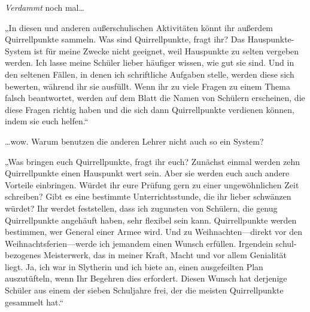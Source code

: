 \emph{Verdammt} noch mal…

„In diesen und anderen außerschulischen Aktivitäten könnt ihr außerdem Quirrellpunkte sammeln. Was sind Quirrellpunkte, fragt ihr? Das Hauspunkte-System ist für meine Zwecke nicht geeignet, weil Hauspunkte zu selten vergeben werden. Ich lasse meine Schüler lieber häufiger wissen, wie gut sie sind. Und in den seltenen Fällen, in denen ich schriftliche Aufgaben stelle, werden diese sich bewerten, während ihr sie ausfüllt. Wenn ihr zu viele Fragen zu einem Thema falsch beantwortet, werden auf dem Blatt die Namen von Schülern erscheinen, die diese Fragen richtig haben und die sich dann Quirrellpunkte verdienen können, indem sie euch helfen.“

…wow. Warum benutzen die anderen Lehrer nicht auch so ein System?

„Was bringen euch Quirrellpunkte, fragt ihr euch? Zunächst einmal werden zehn Quirrellpunkte einen Hauspunkt wert sein. Aber sie werden euch auch andere Vorteile einbringen. Würdet ihr eure Prüfung gern zu einer ungewöhnlichen Zeit schreiben? Gibt es eine bestimmte Unterrichtsstunde, die ihr lieber schwänzen würdet? Ihr werdet feststellen, dass ich zugunsten von Schülern, die genug Quirrellpunkte angehäuft haben, sehr flexibel sein kann. Quirrellpunkte werden bestimmen, wer General einer Armee wird. Und zu Weihnachten—direkt vor den Weihnachtsferien—werde ich jemandem einen Wunsch erfüllen. Irgendein schul-bezogenes Meisterwerk, das in meiner Kraft, Macht und vor allem Genialität liegt. Ja, ich war in Slytherin und ich biete an, einen ausgefeilten Plan auszutüfteln, wenn Ihr Begehren dies erfordert. Diesen Wunsch hat derjenige Schüler aus einem der sieben Schuljahre frei, der die meisten Quirrellpunkte gesammelt hat.“


